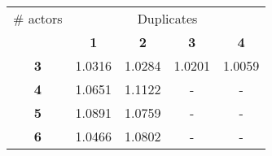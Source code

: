 \begin{tabular}{ | c | c | c | c | c | }
\hline
\# actors & \multicolumn{4}{|c|}{Duplicates} \\ \cline{2-5}
 & {\bf1} & {\bf2} & {\bf3} & {\bf4} \\ \hline
{\bf 3} & 1.0316 & 1.0284 & 1.0201 & 1.0059 \\ \hline
{\bf 4} & 1.0651 & 1.1122 & - & - \\ \hline
{\bf 5} & 1.0891 & 1.0759 & - & - \\ \hline
{\bf 6} & 1.0466 & 1.0802 & - & - \\ \hline
\end{tabular}